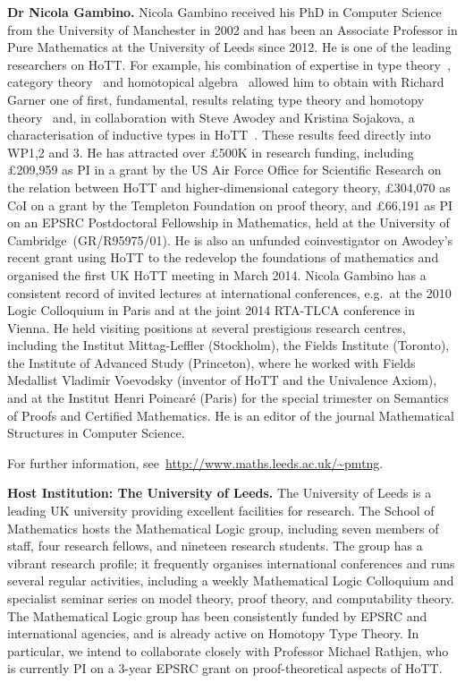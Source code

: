 \documentclass[a4paper,11pt]{article}
\begin{document}
\textbf{Dr Nicola Gambino.} Nicola Gambino received his PhD in
Computer Science from the University of Manchester in 2002 and has
been an Associate Professor in Pure Mathematics at the
University of Leeds since 2012.
He is one of the leading researchers
on HoTT. For example, his combination of expertise in type
theory~\cite{GambinoN:gentti}, category theory~\cite{GambinoN:polfpm}
and homotopical algebra~\cite{GambinoN:homl2c,GambinoN:weilsh} allowed
him to obtain with Richard Garner one of 
first, fundamental, results relating type theory and homotopy
theory~\cite{GambinoN:idetwfs} and, in collaboration with Steve Awodey
and Kristina Sojakova, a characterisation of inductive types in
HoTT~\cite{awodeyGamSoja:indTypesInHTT}. These results feed directly
into WP1,2 and 3. He has attracted over \pounds500K in research
funding, including \pounds 209,959 as PI in a grant by the US Air
Force Office for Scientific Research on the relation between HoTT and
higher-dimensional category theory, \pounds 304,070 as CoI on a grant
by the Templeton Foundation on proof theory, and \pounds 66,191 as PI
on an EPSRC Postdoctoral Fellowship in Mathematics, held at the
University of Cambridge~(GR/R95975/01). He is also an unfunded
coinvestigator on Awodey's recent grant using HoTT to the
redevelop the foundations of mathematics and organised the first
UK HoTT meeting in March 2014. Nicola Gambino has a
consistent record of invited lectures at international conferences,
{e.g.}~at the 2010 Logic Colloquium in Paris and at the joint 2014
RTA-TLCA conference in Vienna. He held visiting positions at several
prestigious research centres, including the Institut Mittag-Leffler
(Stockholm), the Fields Institute (Toronto), the Institute of Advanced
Study (Princeton), where he worked with Fields Medallist Vladimir
Voevodsky (inventor of HoTT and the Univalence Axiom), and at the Institut
Henri Poincar\'e (Paris) for the special trimester on Semantics of
Proofs and Certified Mathematics.  He is an editor of the journal
Mathematical Structures in Computer Science.

For further information,  see~\url{http://www.maths.leeds.ac.uk/~pmtng}.

\textbf{Host Institution: The University of Leeds.} The University of
Leeds is a leading UK university providing
excellent facilities for research. The School of Mathematics hosts the
Mathematical Logic group, including seven members of staff, four
research fellows, and nineteen research students. The group has a
vibrant research profile; it frequently organises
international conferences and runs several regular activities,
including a weekly Mathematical Logic Colloquium and specialist
seminar series on model theory, proof theory, and computability
theory. The Mathematical Logic group has been consistently funded by
EPSRC and international agencies, and is already active on Homotopy
Type Theory. In particular, we intend to collaborate closely with
Professor Michael Rathjen, who is currently PI
on a 3-year EPSRC grant on proof-theoretical aspects of HoTT. 
\end{document}
